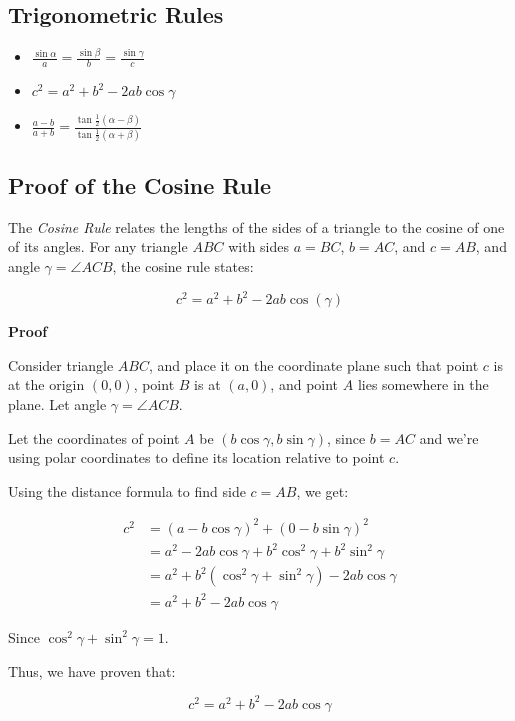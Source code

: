\subsection{Trigonometric Rules}

\begin{itemize}

    \item \(\frac{\sin \alpha}{a} = \frac{\sin \beta}{b} = \frac{\sin \gamma}{c}\)

    \item \(c^2 = a^2 + b^2 - 2ab \cos \gamma\)

    \item \(\frac{a - b}{a + b} = \frac{\tan \frac{1}{2}(\alpha - \beta)}{\tan \frac{1}{2} (\alpha + \beta)}\)

\end{itemize}


\subsection{Proof of the Cosine Rule}

The \emph{Cosine Rule} relates the lengths of the sides of a triangle to the cosine of one of its angles. 
For any triangle \( ABC \) with sides \( a = BC \), \( b = AC \), and \( c = AB \), and angle 
\( \gamma = \angle ACB \), the cosine rule states:

\[
    c^2 = a^2 + b^2 - 2ab\cos(\gamma)
\]

\textbf{Proof}

Consider triangle \( ABC \), and place it on the coordinate plane such that point \(c\) is at the origin
\( (0,0) \), point \(B\) is at \( (a,0) \), and point \(A\) lies somewhere in the plane. 
Let angle \( \gamma = \angle ACB \).
\vspace{\baselineskip}

Let the coordinates of point \(A\) be \( (b\cos\gamma, b\sin\gamma) \), since \( b = AC \) and we’re 
using polar coordinates to define its location relative to point \(c\).
\vspace{\baselineskip}

Using the distance formula to find side \( c = AB \), we get:

\begin{align*}
    c^2 &= {(a - b\cos\gamma)}^2 + {(0 - b\sin\gamma)}^2 \\
    &= a^2 - 2ab\cos\gamma + b^2\cos^2\gamma + b^2\sin^2\gamma \\
    &= a^2 + b^2(\cos^2\gamma + \sin^2\gamma) - 2ab\cos\gamma \\
    &= a^2 + b^2 - 2ab\cos\gamma
\end{align*}

Since \( \cos^2\gamma + \sin^2\gamma = 1 \).
\vspace{\baselineskip}

Thus, we have proven that:

\[
    c^2 = a^2 + b^2 - 2ab\cos\gamma
\]

\QED